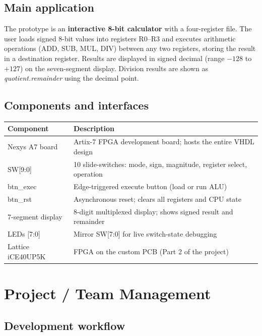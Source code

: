 \documentclass[11pt,a4paper]{article}
\begin{document}
\subsection{Main application}

The prototype is an \textbf{interactive 8-bit calculator} with a four-register
file. The user loads signed 8-bit values into registers R0–R3 and executes
arithmetic operations (ADD, SUB, MUL, DIV) between any two registers, storing
the result in a destination register. Results are displayed in signed decimal
(range $-128$ to $+127$) on the seven-segment display. Division results are
shown as \emph{quotient.remainder} using the decimal point.

\subsection{Components and interfaces}

\begin{center}
\begin{tabularx}{\linewidth}{L{3.5cm}L{9cm}}
  \toprule
  \textbf{Component} & \textbf{Description} \\
  \midrule
  Nexys A7 board      & Artix-7 FPGA development board; hosts the entire VHDL design \\
  SW[9:0]             & 10 slide-switches: mode, sign, magnitude, register select, operation \\
  btn\_exec           & Edge-triggered execute button (load or run ALU) \\
  btn\_rst            & Asynchronous reset; clears all registers and CPU state \\
  7-segment display   & 8-digit multiplexed display; shows signed result and remainder \\
  LEDs [7:0]          & Mirror SW[7:0] for live switch-state debugging \\
  Lattice iCE40UP5K   & FPGA on the custom PCB (Part 2 of the project) \\
  \bottomrule
\end{tabularx}
\end{center}

\section{Project / Team Management}

\subsection{Development workflow}
\end{document}
